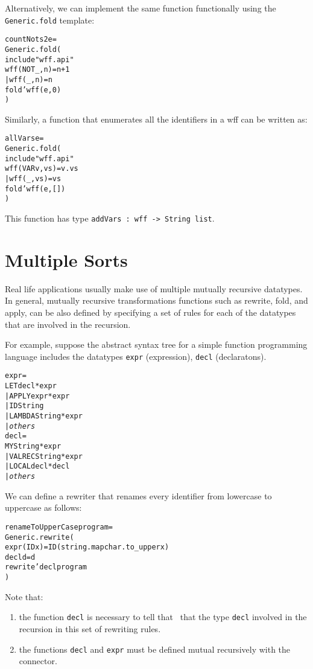 Alternatively, we can implement the same function 
functionally using the \verb|Generic.fold| template:
\begin{alltt}
   \FUN countNots2 e = 
       Generic.fold(
       \LET include "wff.api"
           \FUN wff (NOT _, n) = n+1
             | wff (_, n) = n
       \IN  fold'wff(e, 0)
       \END)
\end{alltt}

Similarly, a function that enumerates all the identifiers in a wff
can be written as:
\begin{alltt}
   \FUN allVars e = 
       Generic.fold(
       \LET include "wff.api"
           \FUN wff (VAR v, vs) = v . vs
             | wff (_, vs) = vs
       \IN  fold'wff(e, [])
       \END)
\end{alltt}
This function has type \verb|addVars : wff -> String list|.

\section{Multiple Sorts}

   Real life applications usually make use of multiple
mutually recursive datatypes.  In general, mutually recursive
transformations functions such as rewrite, fold, and apply, can be also defined  
by specifying a set of rules for each of the datatypes that are involved
in the recursion.  

   For example, suppose the abstract syntax tree  
for a simple function programming language includes 
the datatypes \verb|expr| (expression), 
\verb|decl| (declaratons).

\begin{alltt}
  \DATATYPE expr = 
    LET \OF decl * expr
  | APPLY \OF expr * expr
  | ID \OF String
  | LAMBDA \OF String * expr
  | {\em others}
  \AND decl = 
    MY \OF String * expr
  | VALREC \OF String * expr
  | LOCAL \OF decl * decl
  | {\em others}
\end{alltt}

We can define a rewriter that renames every identifier 
from lowercase to uppercase as follows:
\begin{alltt}
   \FUN renameToUpperCase program =  
   Generic.rewrite(
        \FUN expr (ID x) = ID(string.map char.to_upper x)
        \AND decl d      = d
   \IN  rewrite'decl program
   \END
   )
\end{alltt}

Note that:
\begin{enumerate}
  \item the function \verb|decl| is necessary to tell that 
\RewriteGen\ that the type \verb|decl| involved in the recursion
in this set of rewriting rules.
  \item the functions \verb|decl| and \verb|expr| must be defined 
        mutual recursively with the \AND{} connector.
\end{enumerate}


